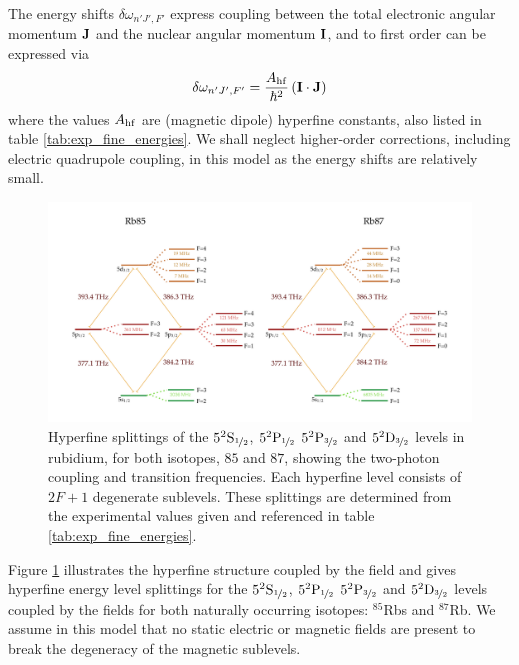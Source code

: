     The energy shifts $\delta \omega_{n' J', F'}$ express coupling between the
    total electronic angular momentum $\bf{J}$ and the nuclear angular momentum
    $\bf{I}$, and to first order can be expressed via
    \begin{equation}
      \delta \omega_{n' J', F'} = 
        \frac{A_{\rm{hf}}}{\hbar^2} \left( \bf{I} \cdot \bf{J} \right)
        \label{eqn:twophoton_energy_shifts}
    \end{equation}
    where the values $A_{\rm{hf}}$ are (magnetic dipole) hyperfine constants,
    also listed in table \ref{tab:exp_fine_energies}. We shall neglect 
    higher-order corrections, including electric quadrupole coupling, in this 
    model as the energy shifts are relatively small.

    \begin{figure}[]
    \includegraphics[width=\linewidth]
        {figs/05_twophoton/5spd_energy_levels.pdf}
    \caption{
    Hyperfine splittings of the $5^2\rm{S}_{\nicefrac{1}{2}}$,
    $5^2\rm{P}_{\nicefrac{1}{2}}$ $5^2\rm{P}_{\nicefrac{3}{2}}$ and
    $5^2\rm{D}_{\nicefrac{3}{2}}$ levels in rubidium, for both isotopes, $85$
    and $87$, showing the two-photon coupling and transition frequencies. Each
    hyperfine level consists of $2F + 1$ degenerate sublevels. These splittings
    are determined from the experimental values given and referenced in table
    \ref{tab:exp_fine_energies}.
    }
    \label{fig:5spd_energy_levels}
    \end{figure}


    Figure \ref{fig:5spd_energy_levels} illustrates the hyperfine structure
    coupled by the field and gives hyperfine energy level splittings for the
    $5^2\rm{S}_{\nicefrac{1}{2}}$, $5^2\rm{P}_{\nicefrac{1}{2}}$
    $5^2\rm{P}_{\nicefrac{3}{2}}$ and $5^2\rm{D}_{\nicefrac{3}{2}}$ levels
    coupled by the fields for both naturally occurring isotopes: $^{85}$Rbs and
    $^{87}$Rb. We  assume in this model that no static electric or magnetic
    fields are present to break the degeneracy of the magnetic sublevels.

